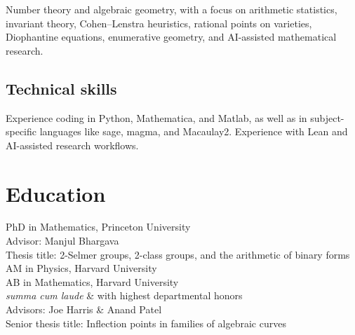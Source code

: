 \documentclass[11pt]{article} %
\begin{document}
Number theory and algebraic geometry, with a focus on arithmetic statistics, invariant theory, Cohen--Lenstra heuristics, rational points on varieties, Diophantine equations, enumerative geometry, and AI-assisted mathematical research.

\vspace*{-3pt}
\subsection*{Technical skills}

Experience coding in Python, Mathematica, and Matlab, as well as in subject-specific languages like sage, magma, and Macaulay2. Experience with Lean and AI-assisted research workflows.





\vspace*{-3pt}
\section*{Education}

 PhD in Mathematics, Princeton University\\
Advisor: Manjul Bhargava \\
Thesis title: 2-Selmer groups, 2-class groups, and the arithmetic of binary forms\\
 AM in Physics, Harvard University \\
 AB in Mathematics, Harvard University \\
\emph{summa cum laude} \& with highest departmental honors\\
Advisors: Joe Harris \& Anand Patel \\
Senior thesis title: Inflection points in families of algebraic curves
\end{document}
